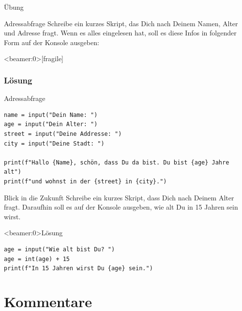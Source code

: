 \begin{frame}{Übung}
\begin{block}{Adressabfrage}
\vspace{2pt}
Schreibe ein kurzes Skript, das Dich nach Deinem Namen, Alter und Adresse fragt. Wenn es alles eingelesen hat, soll es diese Infos in folgender Form auf der Konsole ausgeben: 	

\end{block}
\end{frame}

\begin{frame}<beamer:0>[fragile]
\frametitle{Lösung}
\begin{solutionblock}{Adressabfrage}
\begin{verbatim}
name = input("Dein Name: ")
age = input("Dein Alter: ")
street = input("Deine Addresse: ")
city = input("Deine Stadt: ") 

print(f"Hallo {Name}, schön, dass Du da bist. Du bist {age} Jahre alt")
print(f"und wohnst in der {street} in {city}.")
\end{verbatim}
\end{solutionblock}
\end{frame}



\begin{fragile}[Übung]
\begin{block}{Blick in die Zukunft}
	\vspace{2pt}
Schreibe ein kurzes Skript, dass Dich nach Deinem Alter fragt. Daraufhin soll es auf der Konsole ausgeben, wie alt Du in 15 Jahren sein wirst. 
\end{block}
\vspace{12pt}
\begin{solutionblock}<beamer:0>{Lösung}
\begin{verbatim}
age = input("Wie alt bist Du? ")
age = int(age) + 15
print(f"In 15 Jahren wirst Du {age} sein.")
\end{verbatim}
\end{solutionblock}
\end{fragile}

\section{Kommentare}

